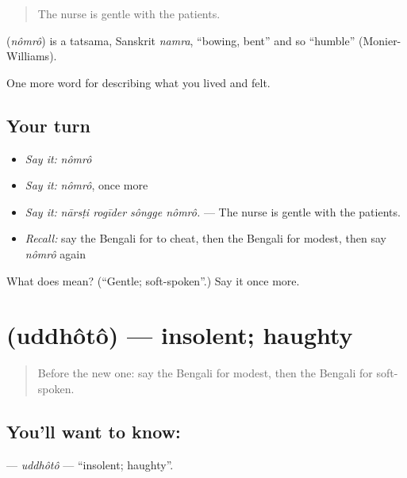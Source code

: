 \begin{quote}
The nurse is gentle with the patients.
\end{quote}

\begin{cousinweb}
\textbf{} (\emph{nômrô}) is a tatsama, Sanskrit \emph{namra}, \textquotedblleft{}bowing, bent\textquotedblright{} and so \textquotedblleft{}humble\textquotedblright{} (Monier-Williams).
\end{cousinweb}

\begin{grammarlens}[title={What you've built}]
One more word for describing what you lived and felt.
\end{grammarlens}

\subsection*{Your turn}
\begin{itemize}
\raggedright
  \item \emph{Say it:} \emph{nômrô}
  \item \emph{Say it:} \emph{nômrô}, once more
  \item \emph{Say it:} \emph{nārsṭi rogīder sôngge nômrô.} — The nurse is gentle with the patients.
  \item \emph{Recall:} say the Bengali for to cheat, then the Bengali for modest, then say \emph{nômrô} again
\end{itemize}

\begin{tcolorbox}[breakable,colback=teal!4,colframe=teal!35!black,title={Before you move on}]
What does  mean? (\textquotedblleft{}Gentle; soft-spoken\textquotedblright{}.) Say it once more.
\end{tcolorbox}
\section[\texorpdfstring{\bn{উদ্ধত} (uddhôtô)}{উদ্ধত (uddhôtô)}]{ (uddhôtô) — insolent; haughty}

\label{lesson:BN-C459-uddhoto}



\begin{quote}
Before the new one: say the Bengali for modest, then the Bengali for soft-spoken.
\end{quote}

\subsection*{You'll want to know: }
\textbf{} — \emph{uddhôtô} — \textquotedblleft{}insolent; haughty\textquotedblright{}.

